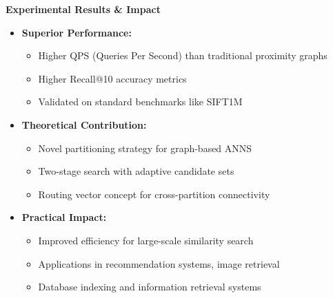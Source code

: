 \begin{frame}
\begin{center}
\Large\textbf{Experimental Results \& Impact}
\end{center}

\vspace{10pt}

\begin{itemize}
    \item \textbf{Superior Performance:}
    \begin{itemize}
        \item Higher QPS (Queries Per Second) than traditional proximity graphs
        \item Higher Recall@10 accuracy metrics
        \item Validated on standard benchmarks like SIFT1M
    \end{itemize}
    
    \item \textbf{Theoretical Contribution:}
    \begin{itemize}
        \item Novel partitioning strategy for graph-based ANNS
        \item Two-stage search with adaptive candidate sets
        \item Routing vector concept for cross-partition connectivity
    \end{itemize}
    
    \item \textbf{Practical Impact:}
    \begin{itemize}
        \item Improved efficiency for large-scale similarity search
        \item Applications in recommendation systems, image retrieval
        \item Database indexing and information retrieval systems
    \end{itemize}
\end{itemize}
\end{frame}%

